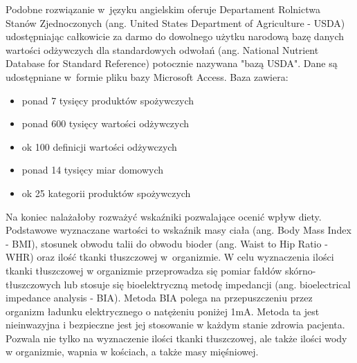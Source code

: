 \par
Podobne rozwiązanie w~języku angielskim oferuje Departament Rolnictwa Stanów Zjednoczonych (ang. United States Department of Agriculture - USDA) udostępniając całkowicie za darmo
do dowolnego użytku narodową bazę danych wartości odżywczych dla standardowych odwołań (ang. National Nutrient Database for Standard Reference)\cite{url:usda-sr-db} potocznie nazywana "bazą USDA".
Dane są udostępniane w~formie pliku bazy Microsoft Access. Baza zawiera:
\begin{itemize}
    \item ponad 7 tysięcy produktów spożywczych
    \item ponad 600 tysięcy wartości odżywczych
    \item ok 100 definicji wartości odżywczych
    \item ponad 14 tysięcy miar domowych
    \item ok 25 kategorii produktów spożywczych
\end{itemize}

\par
Na koniec nalażałoby rozważyć wskaźniki pozwalające ocenić wpływ diety.
Podstawowe wyznaczane wartości to wskaźnik masy ciała (ang. Body Mass Index - BMI), stosunek obwodu talii do obwodu bioder (ang. Waist to Hip Ratio - WHR) oraz ilość tkanki tłuszczowej w~organizmie.
W celu wyznaczenia ilości tkanki tłuszczowej w organizmie przeprowadza się pomiar fałdów skórno-tłuszczowych lub stosuje się bioelektryczną metodę impedancji (ang. bioelectrical impedance analysis - BIA).
Metoda BIA polega na przepuszczeniu przez organizm ładunku elektrycznego o natężeniu poniżej 1mA.
Metoda ta jest nieinwazyjna i bezpieczne jest jej stosowanie w każdym stanie zdrowia pacjenta.
Pozwala nie tylko na wyznaczenie ilości tkanki tłuszczowej, ale także ilości wody w organizmie, wapnia w kościach, a także masy mięśniowej\cite{book:dietetyka-zywienie-zdrowego-i-chorego-czlowieka}.
\thispagestyle{normal}
